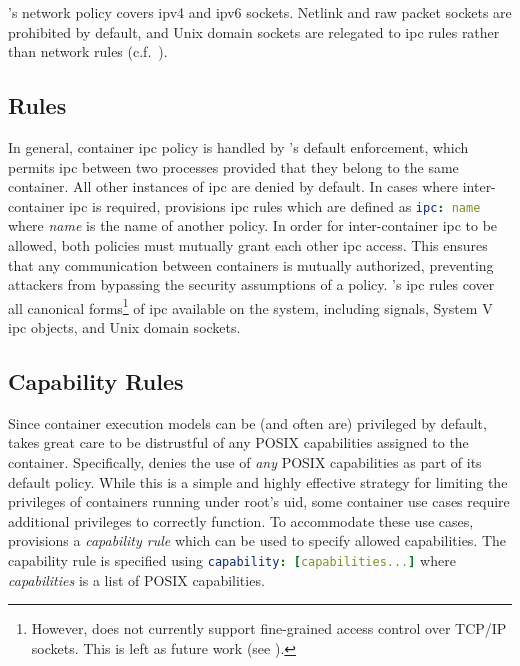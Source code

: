\bpfcontain{}'s network policy covers \gls{ip}v4 and \gls{ip}v6 sockets. Netlink and raw
packet sockets are prohibited by default, and Unix domain sockets are relegated to
\gls{ipc} rules rather than network rules (c.f.\ ).

\subsection{ Rules}%
\label{ss:bpfcontain-ipc}

In general, container \gls{ipc} policy is handled by \bpfcontain{}'s default enforcement,
which permits \gls{ipc} between two processes provided that they belong to the same
container. All other instances of \gls{ipc} are denied by default. In cases where
inter-container \gls{ipc} is required, \bpfcontain{} provisions \gls{ipc} rules which are
defined as \lstinline[language=yaml]|ipc: name| where \textit{name} is the name of another
\bpfcontain{} policy. In order for inter-container \gls{ipc} to be allowed, both policies
must mutually grant each other \gls{ipc} access. This ensures that any communication
between containers is mutually authorized, preventing attackers from bypassing the
security assumptions of a policy. \bpfcontain{}'s \gls{ipc} rules cover all canonical
forms\footnote{However, \bpfcontain{} does not currently support fine-grained access
control over TCP/IP sockets. This is left as future work (see ).}
of \gls{ipc} available on the system, including signals, System V \gls{ipc} objects, and
Unix domain sockets.

\subsection{Capability Rules}

Since container execution models can be (and often are) privileged by default,
\bpfcontain{} takes great care to be distrustful of any POSIX capabilities assigned to the
container. Specifically, \bpfcontain{} denies the use of \textit{any} POSIX capabilities
as part of its default policy. While this is a simple and highly effective strategy for
limiting the privileges of containers running under root's \gls{uid}, some container use
cases require additional privileges to correctly function. To accommodate these use cases,
\bpfcontain{} provisions a \textit{capability rule} which can be used to specify allowed
capabilities. The capability rule is specified using \lstinline[language=yaml]|capability: [capabilities...]|
where \textit{capabilities} is a list of POSIX capabilities.

